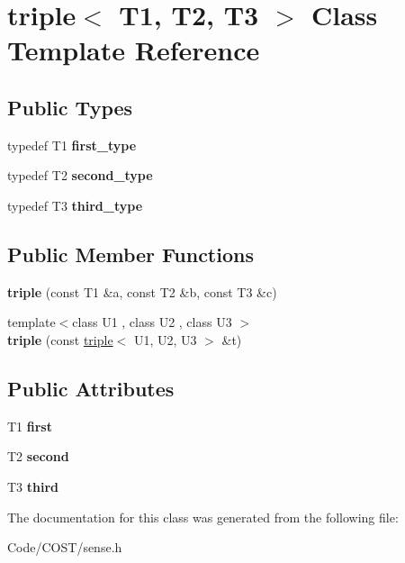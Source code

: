 \hypertarget{classtriple}{}\section{triple$<$ T1, T2, T3 $>$ Class Template Reference}
\label{classtriple}
\subsection*{Public Types}
\begin{DoxyCompactItemize}
\item 
\mbox{\label{classtriple_a1bc82ce3db58dacf9eaa73769e0d987f}} 
typedef T1 {\bfseries first\+\_\+type}
\item 
\mbox{\label{classtriple_ae09496e13fbd15065e140aa5c817e84c}} 
typedef T2 {\bfseries second\+\_\+type}
\item 
\mbox{\label{classtriple_a42a7b3e237924728a0dcc81e07d76233}} 
typedef T3 {\bfseries third\+\_\+type}
\end{DoxyCompactItemize}
\subsection*{Public Member Functions}
\begin{DoxyCompactItemize}
\item 
\mbox{\label{classtriple_a347485433f5a979e43c6dc7f44e7c1c3}} 
{\bfseries triple} (const T1 \&a, const T2 \&b, const T3 \&c)
\item 
\mbox{\label{classtriple_a6b2377dc5cb525ee7d2cedb45f4f1a8e}} 
{\footnotesize template$<$class U1 , class U2 , class U3 $>$ }\\{\bfseries triple} (const \hyperlink{classtriple}{triple}$<$ U1, U2, U3 $>$ \&t)
\end{DoxyCompactItemize}
\subsection*{Public Attributes}
\begin{DoxyCompactItemize}
\item 
\mbox{\label{classtriple_a6aa8508e6e6f859dda04f144f361c0d2}} 
T1 {\bfseries first}
\item 
\mbox{\label{classtriple_a41050194c8c7984707c7ad13c96e8631}} 
T2 {\bfseries second}
\item 
\mbox{\label{classtriple_a5675f08ea7996033edbcf7074404cdd8}} 
T3 {\bfseries third}
\end{DoxyCompactItemize}


The documentation for this class was generated from the following file\+:\begin{DoxyCompactItemize}
\item 
Code/\+C\+O\+S\+T/sense.\+h\end{DoxyCompactItemize}
